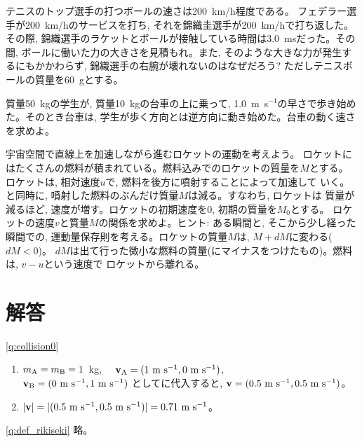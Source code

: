 \begin{exq} テニスのトップ選手の打つボールの速さは200~km/h程度である。
フェデラー選手が200~km/hのサービスを打ち, それを錦織圭選手が200~km/hで打ち返した。
その際, 錦織選手のラケットとボールが接触している時間は3.0~msだった。その間, 
ボールに働いた力の大きさを見積もれ。また, そのような大きな力が発生するにもかかわらず, 
錦織選手の右腕が壊れないのはなぜだろう? ただしテニスボールの質量を60~gとする。\end{exq}

\begin{exq} 質量50~kgの学生が, 質量10~kgの台車の上に乗って, 
1.0~m~s$^{-1}$の早さで歩き始めた。そのとき台車は, 
学生が歩く方向とは逆方向に動き始めた。台車の動く速さを求めよ。\end{exq}

\begin{exq} 宇宙空間で直線上を加速しながら進むロケットの運動を考えよう。
ロケットにはたくさんの燃料が積まれている。燃料込みでのロケットの質量を$M$とする。
ロケットは, 相対速度$u$で, 燃料を後方に噴射することによって加速して
いく。と同時に, 噴射した燃料のぶんだけ質量$M$は減る。すなわち, ロケットは
質量が減るほど, 速度が増す。ロケットの初期速度を0, 初期の質量を$M_0$とする。
ロケットの速度$v$と質量$M$の関係を求めよ。ヒント: ある瞬間と, そこから少し経った
瞬間での, 運動量保存則を考える。ロケットの質量$M$は, $M+dM$に変わる($dM<0$)。
$dM$は出て行った微小な燃料の質量(にマイナスをつけたもの)。燃料は, $v-u$という速度で
ロケットから離れる。\end{exq}


\section{解答}
\ref{q:collision0}
\begin{enumerate}
\item $m_{\text A}=m_{\text B}=1$~kg,　
${\bf v}_{\text A}=(1\text{ m s}^{-1}, 0\text{ m s}^{-1})$, \\
${\bf v}_{\text B}=(0\text{ m s}^{-1}, 1\text{ m s}^{-1})$
としてに代入すると, 
${\bf v}=(0.5\text{ m s}^{-1}, 0.5\text{ m s}^{-1})$。
\item $|{\bf v}|=|(0.5\text{ m s}^{-1}, 0.5\text{ m s}^{-1})|=0.71\text{ m s}^{-1}$。
\end{enumerate}

\ref{q:def_rikiseki} 略。
\mv

